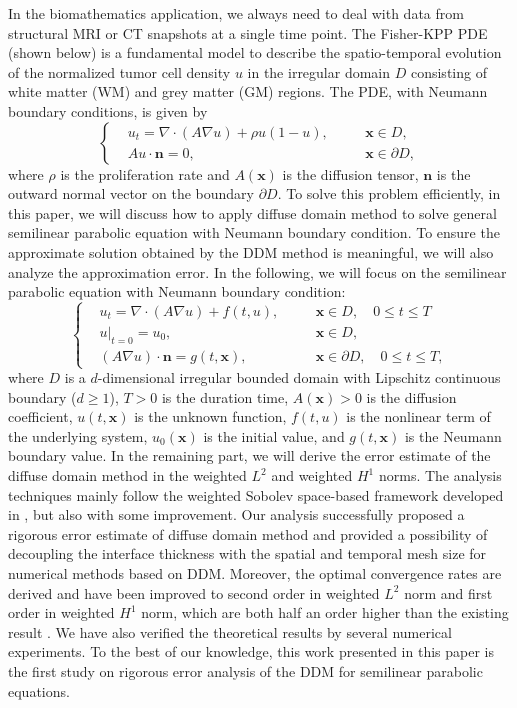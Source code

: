\documentclass[3p,times]{elsarticle}
\numberwithin{equation}{section}
\begin{document}
In the biomathematics application, we always need to deal with data from structural MRI or CT snapshots at a single time point. The Fisher-KPP PDE (shown below) is a fundamental model to describe the spatio-temporal evolution of the normalized tumor cell density $u$ in the irregular domain $D$ consisting of white matter (WM) and grey matter (GM) regions. The PDE, with Neumann boundary conditions, is given by \cite{ZhangEzhov2025}
\begin{equation*}
	\left\{\begin{split}
		&u_t=\nabla\cdot(A\nabla u)+\rho u(1-u), \quad && \bm x \in D,\\
		&Au\cdot\bm n=0,\quad && \bm x\in \partial D, 
	\end{split}\right.
\end{equation*}
where $\rho$ is the proliferation rate and $A(\bm x)$ is the diffusion tensor, $\bm n$ is the outward normal vector on the boundary $\partial D$. To solve this problem efficiently, in this paper, we will discuss how to apply diffuse domain method to solve general semilinear parabolic equation with Neumann boundary condition. To ensure the approximate solution obtained by the DDM method is meaningful, we will also analyze the approximation error. In the following, we will focus on the semilinear parabolic equation with Neumann boundary condition:
\begin{equation}
	\label{eq2-1}
	\left\{
	\begin{split}
		& u_t = \nabla\cdot(A\nabla u) + f(t,u), \quad && \bm x \in D,\quad 0 \leq t \leq T\\
		& u|_{t=0} = u_0, \quad && \bm x \in D,\\
		& (A\nabla u) \cdot \bm n = g(t,\bm x), \quad && \bm x \in \partial D, \quad 0 \leq t \leq T,
	\end{split}
	\right.
\end{equation}
where $D$ is a $d$-dimensional irregular bounded domain with Lipschitz continuous boundary ($d\geq 1$), $T>0$ is the duration time, $A(\bm x)>0$ is the diffusion coefficient, $u(t,\bm x)$ is the unknown function,   $f(t,u)$ is the nonlinear term of the underlying system, $u_0(\bm x)$ is the initial value, and $g(t,\bm x)$ is the Neumann boundary value. In the remaining part, we will derive the error estimate of the diffuse domain method in the weighted $L^2$ and weighted $H^1$ norms. The analysis techniques mainly follow the weighted Sobolev space-based framework developed in \cite{BurgerElvetun2017}, but also with some improvement. Our analysis successfully proposed a rigorous error estimate of diffuse domain method and provided a possibility of decoupling the interface thickness with the spatial and temporal mesh size for numerical methods based on DDM. Moreover, the optimal convergence rates are derived and have been improved to second order in weighted $L^2$ norm and first order in weighted $H^1$ norm, which are both half an order higher than the existing result \cite{BurgerElvetun2017}. We have also verified the theoretical results by several numerical experiments. To the best of our knowledge, this work presented in this paper is the first study on rigorous error analysis of the DDM for semilinear parabolic equations. 
\end{document}

